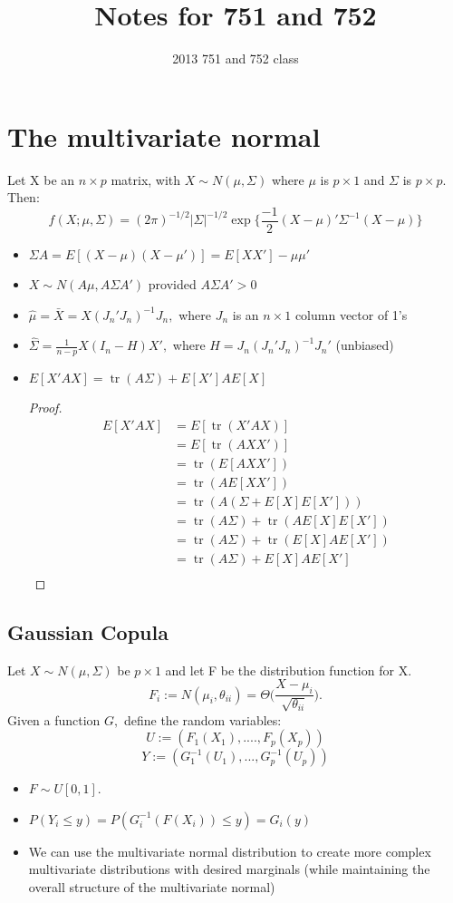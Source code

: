 \documentclass[12pt]{article}\usepackage{graphicx, color}
\title{Notes for 751 and 752}
\author{2013 751 and 752 class}
\theoremstyle{definition}
\renewcommand{\hat}{\widehat}
\DeclareMathOperator{\tr}{tr}
\begin{document}
\maketitle

\section{The multivariate normal}
Let X be an $n\times p$ matrix, with $X\sim N(\mu, \Sigma)$ where $\mu$ is $p \times 1$ and $\Sigma$ is $p\times p$. Then:
$$f(X; \mu, \Sigma) = (2\pi)^{-1/2}|\Sigma|^{-1/2}\exp\{\frac{-1}{2}(X-\mu)'\Sigma^{-1}(X-\mu)\}$$
\begin{itemize}
\item $\Sigma A =E[(X-\mu)(X-\mu')]=E[XX']-\mu\mu'$
\item $X\sim N(A\mu, A\Sigma A')$ provided $A\Sigma A'>0$
\item $\hat \mu = \bar X = X (J_n'J_n)^{-1}J_n,$ where $J_n$ is an $n\times 1$ column vector of 1's
\item $\hat \Sigma = \frac{1}{n-p}X(I_n-H)X',$ where $H=J_n(J_n'J_n)^{-1}J_n'$ (unbiased)
\item $E[X'AX]=\tr(A\Sigma)+E[X']AE[X]$
\begin{proof}
\begin{align*}E[X'AX]&=E[\tr(X'AX)]\\
&=E[\tr(AXX')]\\
&=\tr(E[AXX'])\\
&=\tr(AE[XX'])\\
&=\tr(A(\Sigma+E[X]E[X']))\\
&=\tr(A\Sigma)+\tr(AE[X]E[X'])\\
&=\tr(A\Sigma)+\tr(E[X]AE[X'])\\
&=\tr(A\Sigma)+E[X]AE[X']\\
\end{align*}
\end{proof}
\end{itemize} 
\subsection{Gaussian Copula} 
Let $X \sim N(\mu, \Sigma)$ be $p\times 1$ and let F be the distribution function for X. 
$$F_i:=N(\mu_i, \theta_{ii})=\Theta\big(\frac{X-\mu_i}{\sqrt{\theta_{ii}}}\big).$$
Given a function $G,$ define the random variables:
$${U}:=(F_1(X_1), ...., F_p(X_p))$$ 
$$Y:=(G_1^{-1}(U_1), ...,G_p^{-1}(U_p))$$
\begin{itemize}
\item $F\sim U[0,1]$.
\item $P(Y_i \leq y)=P(G_i^{-1}(F(X_i))\leq y)=G_i(y)$
\item We can use the multivariate normal distribution to create more complex multivariate distributions with desired marginals (while maintaining the overall structure of the multivariate normal)
\end{itemize}
\end{document}
